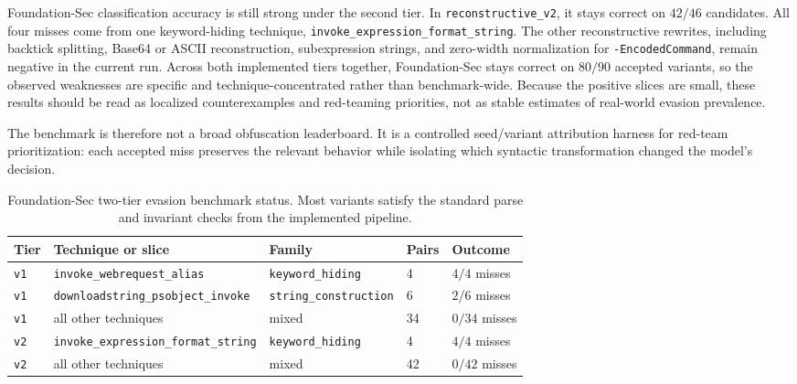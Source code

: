 \documentclass{article}
\begin{document}
Foundation-Sec classification accuracy is still strong under the second tier. In \texttt{reconstructive\_v2}, it stays correct on \(42/46\) candidates. All four misses come from one keyword-hiding technique, \texttt{invoke\_expression\_format\_string}. The other reconstructive rewrites, including backtick splitting, Base64 or ASCII reconstruction, subexpression strings, and zero-width normalization for \texttt{-EncodedCommand}, remain negative in the current run. Across both implemented tiers together, Foundation-Sec stays correct on \(80/90\) accepted variants, so the observed weaknesses are specific and technique-concentrated rather than benchmark-wide. Because the positive slices are small, these results should be read as localized counterexamples and red-teaming priorities, not as stable estimates of real-world evasion prevalence.

The benchmark is therefore not a broad obfuscation leaderboard. It is a controlled seed/variant attribution harness for red-team prioritization: each accepted miss preserves the relevant behavior while isolating which syntactic transformation changed the model's decision.

\begin{table}[!htbp]
\centering
\caption{Foundation-Sec two-tier evasion benchmark status. Most variants satisfy the standard parse and invariant checks from the implemented pipeline.}
\label{tab:evasion-results}
\begin{tabular}{lllll}
\toprule
Tier & Technique or slice & Family & Pairs & Outcome \\
\midrule
\texttt{v1}& \texttt{invoke\_webrequest\_alias} & \texttt{keyword\_hiding} & 4 & $4/4$ misses \\
\texttt{v1}& \texttt{downloadstring\_psobject\_invoke} & \texttt{string\_construction} & 6 & $2/6$ misses \\
\texttt{v1}& all other techniques & mixed & 34 & $0/34$ misses \\
\texttt{v2}& \texttt{invoke\_expression\_format\_string} & \texttt{keyword\_hiding} & 4 & $4/4$ misses \\
\texttt{v2}& all other techniques & mixed & 42 & $0/42$ misses \\
\bottomrule
\end{tabular}
\end{table}
\end{document}
